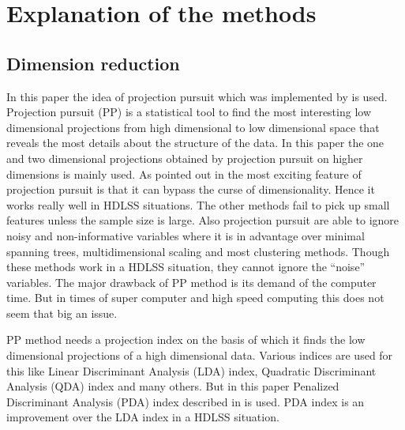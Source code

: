 \documentclass[12]{article}
\begin{document}

\section{Explanation of the methods}

 
\subsection{Dimension reduction}

In this paper the idea of projection pursuit which was implemented by \cite{friedman:1974} is used. Projection pursuit (PP) is a statistical tool to find the most interesting low dimensional projections from high dimensional to low dimensional space that reveals the most details about the structure of the data. In this paper the one and two dimensional projections obtained by projection pursuit on higher dimensions is mainly used.  As pointed out in \cite{huber:1985} the most exciting feature of projection pursuit is that it can bypass the curse of dimensionality. Hence it works really well in HDLSS situations. The other methods fail to pick up small features unless the sample size is large. Also projection pursuit are able to ignore noisy and non-informative variables where it is in advantage over minimal spanning trees, multidimensional scaling and most clustering methods. Though these methods work in a HDLSS situation, they cannot ignore the ``noise'' variables. The  major drawback of PP method is its demand of the computer time. But in times of super computer and high speed computing this does not seem that big an issue.

PP method needs a projection index on the basis of which it finds the low dimensional projections of a high dimensional data. Various indices are used for this like Linear Discriminant Analysis (LDA) index, Quadratic Discriminant Analysis (QDA) index and many others. But in this paper Penalized Discriminant Analysis (PDA) index described in \cite{lee:2009} is used. PDA index is an improvement over the LDA index in a HDLSS situation. 
\end{document}
